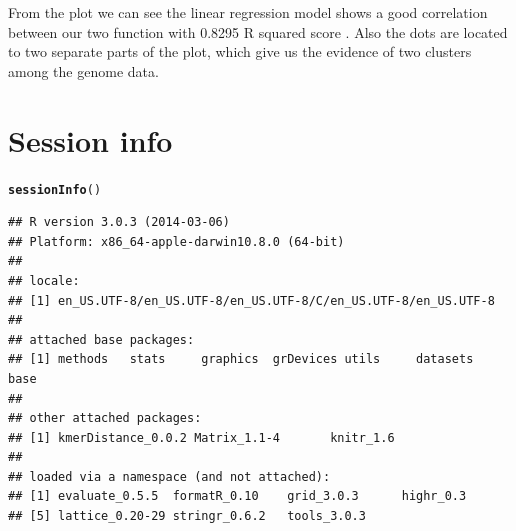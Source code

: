 \documentclass{article}\usepackage[]{graphicx}\usepackage[]{color}
\makeatletter
\newcommand{\hlstd}[1]{\textcolor[rgb]{0.345,0.345,0.345}{#1}}%
\newcommand{\hlkwd}[1]{\textcolor[rgb]{0.737,0.353,0.396}{\textbf{#1}}}%
\newenvironment{kframe}{%
 \def\at@end@of@kframe{}%
 \ifinner\ifhmode%
  \def\at@end@of@kframe{\end{minipage}}%
  \begin{minipage}{\columnwidth}%
 \fi\fi%
 \def\FrameCommand##1{\hskip\@totalleftmargin \hskip-\fboxsep
 \colorbox{shadecolor}{##1}\hskip-\fboxsep
     \hskip-\linewidth \hskip-\@totalleftmargin \hskip\columnwidth}%
 \MakeFramed {\advance\hsize-\width
   \@totalleftmargin\z@ \linewidth\hsize
   \@setminipage}}%
 {\par\unskip\endMakeFramed%
 \at@end@of@kframe}
\newenvironment{knitrout}{}{} %
\makeatother
\begin{document}
From the plot we can see the linear regression model shows a good correlation between our two function with 0.8295 R squared score  . Also the dots are located to two separate parts of the plot, which give us the evidence of two clusters among the genome data.


\section{Session info}
\label{sec.sessioninfo}

\begin{knitrout}
\color{fgcolor}\begin{kframe}
\begin{alltt}
\hlkwd{sessionInfo}\hlstd{()}
\end{alltt}
\begin{verbatim}
## R version 3.0.3 (2014-03-06)
## Platform: x86_64-apple-darwin10.8.0 (64-bit)
## 
## locale:
## [1] en_US.UTF-8/en_US.UTF-8/en_US.UTF-8/C/en_US.UTF-8/en_US.UTF-8
## 
## attached base packages:
## [1] methods   stats     graphics  grDevices utils     datasets  base     
## 
## other attached packages:
## [1] kmerDistance_0.0.2 Matrix_1.1-4       knitr_1.6         
## 
## loaded via a namespace (and not attached):
## [1] evaluate_0.5.5  formatR_0.10    grid_3.0.3      highr_0.3      
## [5] lattice_0.20-29 stringr_0.6.2   tools_3.0.3
\end{verbatim}
\end{kframe}
\end{knitrout}



\end{document}
